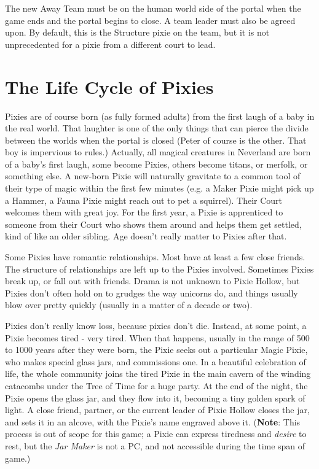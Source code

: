 \documentclass[blue]{PP}
\begin{document}
The new Away Team must be on the human world side of the portal when the game ends and the portal begins to close. A team leader must also be agreed upon. By default, this is the Structure pixie on the team, but it is not unprecedented for a pixie from a different court to lead.

\section*{The Life Cycle of Pixies}
Pixies are of course born (as fully formed adults) from the first laugh of a baby in the real world. That laughter is one of the only things that can pierce the divide between the worlds when the portal is closed (Peter of course is the other. That boy is impervious to rules.) Actually, all magical creatures in Neverland are born of a baby’s first laugh, some become Pixies, others become titans, or merfolk, or something else. A new-born Pixie will naturally gravitate to a common tool of their type of magic within the first few minutes (e.g. a Maker Pixie might pick up a Hammer, a Fauna Pixie might reach out to pet a squirrel). Their Court welcomes them with great joy. For the first year, a Pixie is apprenticed to someone from their Court who shows them around and helps them get settled, kind of like an older sibling. Age doesn’t really matter to Pixies after that. 

Some Pixies have romantic relationships. Most have at least a few close friends. The structure of relationships are left up to the Pixies involved. Sometimes Pixies break up, or fall out with friends. Drama is not unknown to Pixie Hollow, but Pixies don’t often hold on to grudges the way unicorns do, and things usually blow over pretty quickly (usually in a matter of a decade or two).

Pixies don’t really know loss, because pixies don’t die. Instead, at some point, a Pixie becomes tired - very tired. When that happens, usually in the range of 500 to 1000 years after they were born, the Pixie seeks out a particular Magic Pixie, who makes special glass jars, and commissions one. In a beautiful celebration of life, the whole community joins the tired Pixie in the main cavern of the winding catacombs under the Tree of Time for a huge party. At the end of the night, the Pixie opens the glass jar, and they flow into it, becoming a tiny golden spark of light.  A close friend, partner, or the current leader of Pixie Hollow closes the jar, and sets it in an alcove, with the Pixie’s name engraved above it. (\textbf{Note}: This process is out of scope for this game; a Pixie can express tiredness and \textit{desire} to rest, but the \textit{Jar Maker} is not a PC, and not accessible during the time span of game.)
\end{document}
